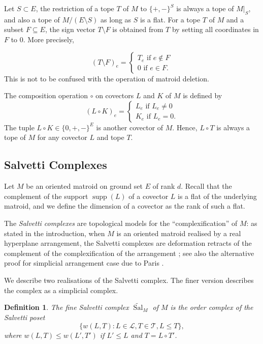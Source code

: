 \documentclass{amsart}
\newtheorem{definition}[theorem]{Definition}
\newcommand\Lcal{{\mathcal L}}
\newcommand\Tcal{{\mathcal T}}
\DeclareMathOperator{\supp}{supp}
\DeclareMathOperator{\Sal}{Sal}
\begin{document}
{Let $S\subset E$, the restriction of a tope $T$ of $M$ to $\{+,-\}^S$ is always a tope of $M|_S$, and also a tope of $M/(E\setminus S)$ as long as $S$ is a flat. 
For a tope $T$ of $M$ and a subset $F\subseteq E$, the sign vector $T\setminus F$ is obtained from $T$ by setting all coordinates in $F$ to $0$. More precisely, 

$$ (T \setminus F)_e = 
\begin{cases} 
T_e \text{ \ \  if } e \not \in F \\
 0\text{ \ \ \  if } e \in F.
 \end{cases}
 $$ 
This is not to be confused with the operation of matroid deletion.

The composition operation $\circ$ on covectors $L$ and $K$ of $M$ is defined by 
$$(L \circ K)_e = 
\begin{cases} 
L_e \text{ \ \  if } L_e \neq 0\\
 K_e \text{ \ \ \  if } L_e = 0 .
 \end{cases}
$$
The tuple $L \circ K \in \{0, +, -\}^E$ is another covector of $M$.
Hence, $L \circ T$ is always a tope of $M$ for any covector $L$ and tope $T$.

\subsection{Salvetti Complexes}

Let $M$ be an oriented matroid on ground set $E$ of rank $d$.
Recall that the complement of the support $\supp(L)$ of a covector $L$ is a flat of the underlying matroid, and we define the dimension of a covector as the rank of such a flat.

The {\em Salvetti complexes} are topological models for the ``complexification'' of $M$: as stated in the introduction, when $M$ is an oriented matroid realised by a real hyperplane arrangement, the Salvetti complexes are deformation retracts of the complement of the complexification of the arrangement \cite{DDP_Sal, Sal87}; see also the alternative proof for simplicial arrangement case due to Paris \cite{Paris93}.

We describe two realisations of the Salvetti complex.
The finer version describes the complex as a simplicial complex.

\begin{definition}
The {\em fine Salvetti complex} $\widetilde{\Sal}_M$ of $M$ is the order complex of the {\em Salvetti poset} $$\{w(L,T):L\in\Lcal, T\in\Tcal, L\leq T\},$$
where $w(L,T)\leq w(L', T')$ if $L'\leq L$ and $T=L\circ T'$.
\end{definition}

}
\end{document}
